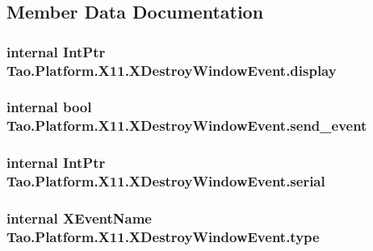 \subsection{Member Data Documentation}
\hypertarget{struct_tao_1_1_platform_1_1_x11_1_1_x_destroy_window_event_a2faa57236d96bb1f22bbc0ebb14dd21f}{
\subsubsection[{display}]{\setlength{\rightskip}{0pt plus 5cm}internal IntPtr {\bf Tao.Platform.X11.XDestroyWindowEvent.display}}}
\label{struct_tao_1_1_platform_1_1_x11_1_1_x_destroy_window_event_a2faa57236d96bb1f22bbc0ebb14dd21f}
\hypertarget{struct_tao_1_1_platform_1_1_x11_1_1_x_destroy_window_event_a1f0832d8c794d428576bcabc60914cf3}{
\subsubsection[{send\_\-event}]{\setlength{\rightskip}{0pt plus 5cm}internal bool {\bf Tao.Platform.X11.XDestroyWindowEvent.send\_\-event}}}
\label{struct_tao_1_1_platform_1_1_x11_1_1_x_destroy_window_event_a1f0832d8c794d428576bcabc60914cf3}
\hypertarget{struct_tao_1_1_platform_1_1_x11_1_1_x_destroy_window_event_a7d0b5d9db01650e70a55857957c0d3b3}{
\subsubsection[{serial}]{\setlength{\rightskip}{0pt plus 5cm}internal IntPtr {\bf Tao.Platform.X11.XDestroyWindowEvent.serial}}}
\label{struct_tao_1_1_platform_1_1_x11_1_1_x_destroy_window_event_a7d0b5d9db01650e70a55857957c0d3b3}
\hypertarget{struct_tao_1_1_platform_1_1_x11_1_1_x_destroy_window_event_a351c579972c4933ea398b3704ea9561a}{
\subsubsection[{type}]{\setlength{\rightskip}{0pt plus 5cm}internal {\bf XEventName} {\bf Tao.Platform.X11.XDestroyWindowEvent.type}}}
